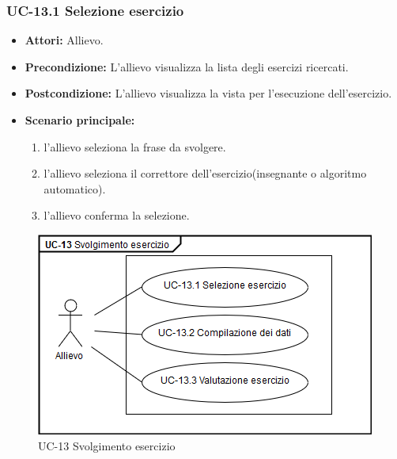 	\subsubsection{UC-13.1 Selezione esercizio}
	\begin{itemize}
			\item \textbf{Attori:} Allievo.
			\item \textbf{Precondizione:} L'allievo visualizza la lista degli esercizi ricercati.
			\item \textbf{Postcondizione:} L'allievo visualizza la vista per l'esecuzione dell'esercizio.
			\item \textbf{Scenario principale:}
			\begin{enumerate}
					\item l'allievo seleziona la frase da svolgere.
					\item l'allievo seleziona il correttore dell'esercizio(insegnante o algoritmo automatico).
					\item l'allievo conferma la selezione.
			\end{enumerate}
	\end{itemize}
			\begin{figure}[h]
		\centering
		\includegraphics[scale=0.7]{images/UC-13_1.png}
		\caption{UC-13 Svolgimento esercizio}
	\end{figure}


